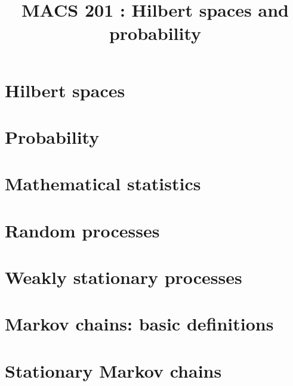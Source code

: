 \documentclass[a4paper,9pt]{article}
\title{\vspace{-1.2cm} \textbf{MACS 201 : Hilbert spaces and probability}}
\begin{document}
\maketitle

\vspace{-1.5cm}

\section{Hilbert spaces}

	

\section{Probability}

	

\section{Mathematical statistics}

	

\section{Random processes}

	

\section{Weakly stationary processes}

	

\section{Markov chains: basic definitions}

	

\section{Stationary Markov chains}

	
\end{document}
